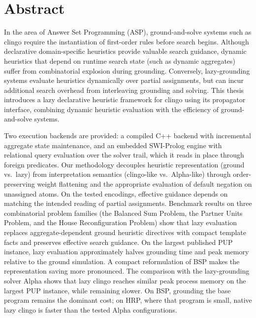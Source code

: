 \chapter*{Abstract}

In the area of Answer Set Programming (ASP), ground-and-solve systems such as clingo require the instantiation of first-order rules before search begins. Although declarative domain-specific heuristics provide valuable search guidance, dynamic heuristics that depend on runtime search state (such as dynamic aggregates) suffer from combinatorial explosion during grounding. Conversely, lazy-grounding systems evaluate heuristics dynamically over partial assignments, but can incur additional search overhead from interleaving grounding and solving. This thesis introduces a lazy declarative heuristic framework for clingo using its propagator interface, combining dynamic heuristic evaluation with the efficiency of ground-and-solve systems.

Two execution backends are provided: a compiled C++ backend with incremental aggregate state maintenance, and an embedded SWI-Prolog engine with relational query evaluation over the solver trail, which it reads in place through foreign predicates. Our methodology decouples heuristic representation (ground vs.\ lazy) from interpretation semantics (clingo-like vs.\ Alpha-like) through order-preserving weight flattening and the appropriate evaluation of default negation on unassigned atoms. On the tested encodings, effective guidance depends on matching the intended reading of partial assignments. Benchmark results on three combinatorial problem families (the Balanced Sum Problem, the Partner Units Problem, and the House Reconfiguration Problem) show that lazy evaluation replaces aggregate-dependent ground heuristic directives with compact template facts and preserves effective search guidance. On the largest published PUP instance, lazy evaluation approximately halves grounding time and peak memory relative to the ground simulation. A compact reformulation of BSP makes the representation saving more pronounced. The comparison with the lazy-grounding solver Alpha shows that lazy clingo reaches similar peak process memory on the largest PUP instance, while remaining slower. On BSP, grounding the base program remains the dominant cost; on HRP, where that program is small, native lazy clingo is faster than the tested Alpha configurations.



